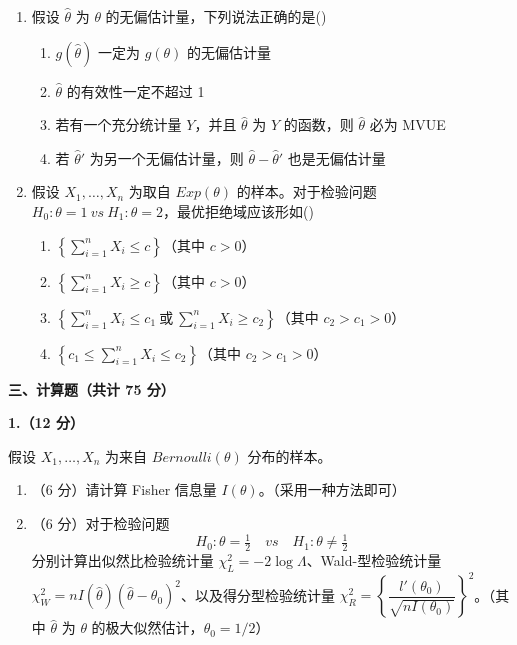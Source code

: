 \documentclass[12pt,a4paper]{ctexart}
\newcommand{\question}[1]{\bigskip\noindent\textbf{#1}\par\nobreak\medskip}
\begin{document}
\begin{enumerate}[label=\arabic*.,leftmargin=2.2em]
  \item 假设 $\widehat{\theta}$ 为 $\theta$ 的无偏估计量，下列说法正确的是\hfill(\underline{\hspace{1.2cm}})
  \begin{enumerate}[label=\Alph*.,leftmargin=2.0em]
    \item $g(\widehat{\theta})$ 一定为 $g(\theta)$ 的无偏估计量
    \item $\widehat{\theta}$ 的有效性一定不超过 1
    \item 若有一个充分统计量 $Y$，并且 $\widehat{\theta}$ 为 $Y$ 的函数，则 $\widehat{\theta}$ 必为 MVUE
    \item 若 $\widehat{\theta}'$ 为另一个无偏估计量，则 $\widehat{\theta}-\widehat{\theta}'$ 也是无偏估计量
  \end{enumerate}

  \item 假设 $X_{1},\ldots,X_{n}$ 为取自 $Exp(\theta)$ 的样本。对于检验问题 $H_{0}:\theta=1\ vs\ H_{1}:\theta=2$，最优拒绝域应该形如\hfill(\underline{\hspace{1.2cm}})
  \begin{enumerate}[label=\Alph*.,leftmargin=2.0em]
    \item $\left\{\sum_{i=1}^{n}X_{i}\le c\right\}$（其中 $c>0$）
    \item $\left\{\sum_{i=1}^{n}X_{i}\ge c\right\}$（其中 $c>0$）
    \item $\left\{\sum_{i=1}^{n}X_{i}\le c_{1}\ 或\ \sum_{i=1}^{n}X_{i}\ge c_{2}\right\}$（其中 $c_{2}>c_{1}>0$）
    \item $\left\{c_{1}\le\sum_{i=1}^{n}X_{i}\le c_{2}\right\}$（其中 $c_{2}>c_{1}>0$）
  \end{enumerate}
\end{enumerate}

\bigskip
\begin{center}\textbf{三、计算题（共计 75 分）}\end{center}

\question{1.（12 分）}
假设 $X_{1},\ldots,X_{n}$ 为来自 $Bernoulli(\theta)$ 分布的样本。
\begin{enumerate}[label=(\arabic*),leftmargin=2.4em]
  \item （6 分）请计算 Fisher 信息量 $I(\theta)$。（采用一种方法即可）
  \item （6 分）对于检验问题
  \[ H_{0}:\theta=\tfrac{1}{2}\quad vs\quad H_{1}:\theta\neq\tfrac{1}{2} \]
  分别计算出似然比检验统计量 $\chi_{L}^{2}=-2\log\Lambda$、Wald-型检验统计量 $\chi_{W}^{2}=nI(\widehat{\theta})(\widehat{\theta}-\theta_{0})^{2}$、以及得分型检验统计量 $\chi_{R}^{2}=\left\{\dfrac{l'(\theta_{0})}{\sqrt{nI(\theta_{0})}}\right\}^{2}$。（其中 $\widehat{\theta}$ 为 $\theta$ 的极大似然估计，$\theta_{0}=1/2$）
\end{enumerate}
\end{document}
